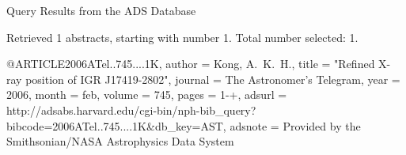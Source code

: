 Query Results from the ADS Database


Retrieved 1 abstracts, starting with number 1.  Total number selected: 1.

@ARTICLE{2006ATel..745....1K,
   author = {{Kong}, A.~K.~H.},
    title = "{Refined X-ray position of IGR J17419-2802}",
  journal = {The Astronomer's Telegram},
     year = 2006,
    month = feb,
   volume = 745,
    pages = {1-+},
   adsurl = {http://adsabs.harvard.edu/cgi-bin/nph-bib_query?bibcode=2006ATel..745....1K&db_key=AST},
  adsnote = {Provided by the Smithsonian/NASA Astrophysics Data System}
}


